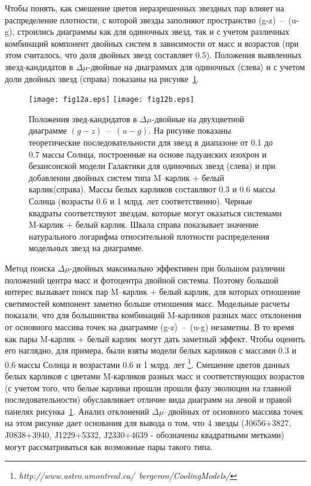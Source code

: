 Чтобы понять, как смешение цветов неразрешенных звездных пар влияет на распределение плотности, с которой звезды заполняют пространство (g-z)~--~(u-g), строились диаграммы как для одиночных звезд, так и с учетом различных комбинаций компонент двойных систем в зависимости от масс и возрастов (при этом считалось, что доля двойных звезд составляет 0.5).  Положения выявленных звезд-кандидатов в $\Delta\mu$-двойные на диаграммах для одиночных (слева) и с учетом доли двойных звезд (справа) показаны на рисунке~\ref{fig:15color}.
\begin{figure}[h]
\centering
\texttt{[image: fig12a.eps]}
\texttt{[image: fig12b.eps]}
\caption{Положения звед-кандидатов в $\Delta\mu$-двойные на двухцветной диаграмме $(g-z)$~--~$(u-g)$. На рисунке показаны теоретические последовательности для звезд в диапазоне от 0.1 до 0.7 массы Солнца, построенные на основе падуанских изохрон и безансонской модели Галактики для одиночных звезд (слева) и при добавлении двойных систем типа  \glqq M--карлик + белый карлик\grqq  (справа). Массы белых карликов составляют 0.3 и 0.6 массы Солнца (возрасты 0.6 и 1 млрд. лет соответственно). Черные квадраты соответствуют звездам, которые могут оказаться системами  \glqq M-карлик + белый карлик\grqq . Шкала справа показывает значение натурального логарифма относительной плотности распределения модельных звезд на диаграмме.}
\label{fig:15color}
\end{figure}
Метод поиска $\Delta\mu$-двойных максимально эффективен при большом различии положений центра масс и фотоцентра двойной системы. Поэтому большой интерес вызывает поиск пар \glqq M--карлик + белый карлик\grqq , для которых отношение светимостей компонент заметно больше отношения масс. Модельные расчеты показали, что для большинства комбинаций M-карликов разных масс отклонения от основного массива точек на диаграмме (g-z)~--~(u-g) незаметны. В то время как пары \glqq M-карлик + белый карлик\grqq\ могут дать заметный эффект. Чтобы оценить его наглядно, для примера, были взяты модели белых карликов  с массами 0.3 и 0.6 массы Солнца и возрастами 0.6 и 1 млрд. лет \footnote{\textit{http://www.astro.umontreal.ca/~bergeron/CoolingModels/}}. Смешение цветов данных белых карликов с цветами M-карликов разных масс и соответствующих возрастов (с учетом того, что белые карлики прошли прошли фазу эволюции на главной последовательности) обуславливает отличие вида диаграмм на левой и правой панелях рисунка~\ref{fig:15color}.  Анализ отклонений $\Delta\mu$--двойных от основного массива точек на этом рисунке дает основания для вывода о том, что 4 звезды (J0656+3827, J0838+3940, J1229+5332, J2330+4639 - обозначены квадратными метками) могут рассматриваться как возможные пары такого типа.

